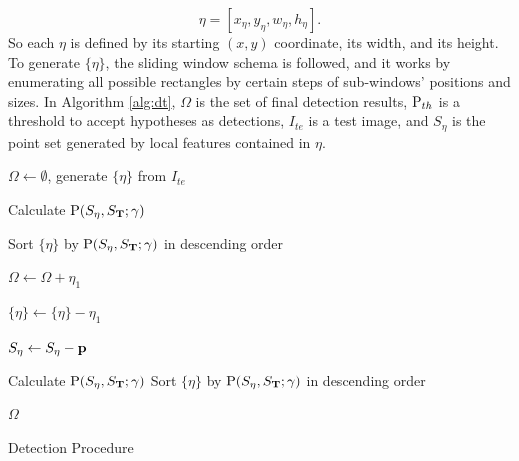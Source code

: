 \[\eta=[x_{\eta},y_{\eta},w_{\eta},h_{\eta}].\] So each $\eta$ is defined by its starting $(x,y)$ coordinate, its width, and its height. To generate $\{\eta \}$, the sliding window schema is followed, and it works by enumerating all possible rectangles by certain steps of sub-windows' positions and sizes. In Algorithm \ref{alg:dt}, ${\Omega }$ is the set of final detection results, ${\rm P}_{th}$ is a threshold to accept hypotheses as detections, $I_{te}$ is a test image, and $S_{\eta}$ is the point set generated by local features contained in ${\eta}$.


\begin{algorithm}[chapter]






    \begin{algorithmic}[1]


       \STATE ${\Omega }  \leftarrow \emptyset$, generate $\{\eta \}$ from $I_{te}$

        \FOR{$ \eta \in \{\eta \}$}

     \STATE  Calculate ${\rm P}(S_{\eta},S_{\bf{T}};\gamma)$

        \ENDFOR


    \STATE Sort $\{\eta \}$ by ${\rm P}(S_{\eta},S_{\bf{T}};\gamma)$ in descending order

     \STATE  ${\Omega }  \leftarrow  {\Omega } + \eta_1$

       \STATE  $\{ \eta \}  \leftarrow  \{ \eta \} - \eta_1$

       \FOR {$\eta \in \{\eta \}$}


        \STATE  $S_{\eta} \leftarrow S_{\eta} - \bf{p} $

       \ENDIF
         \ENDFOR
       \ENDFOR
       \STATE  Calculate ${\rm P}(S_{\eta},S_{\bf{T}};\gamma)$
       \ENDFOR
        \STATE Sort $\{\eta \}$ by ${\rm P}(S_{\eta},S_{\bf{T}};\gamma)$ in descending order
    \ENDWHILE

    \RETURN ${\Omega } $


    \end{algorithmic}

    \caption{Detection Procedure}
    \label{alg:dt}

\end{algorithm}






